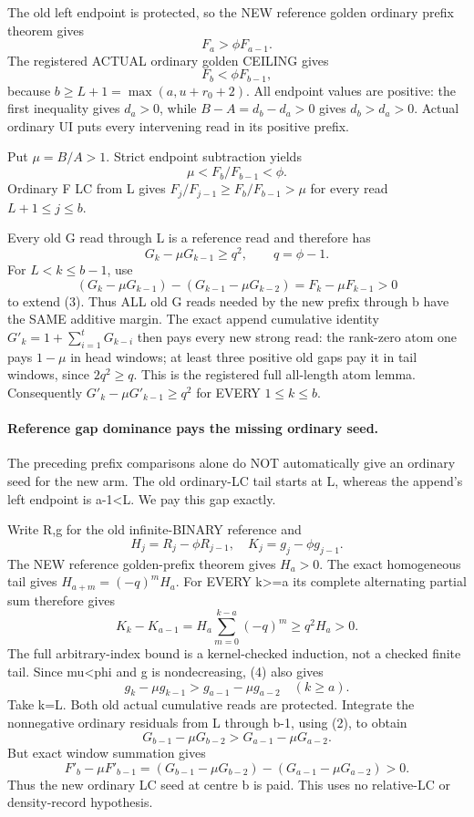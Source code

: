 The old left endpoint is protected, so the NEW reference golden
ordinary prefix theorem gives
\[
                    F_a>\phi F_{a-1}.
\]
The registered ACTUAL ordinary golden CEILING gives
\[
                    F_b<\phi F_{b-1},
\]
because $b\ge L+1=\max(a,u+r_0+2)$.
All endpoint values are positive: the first inequality gives $d_a>0$,
while $B-A=d_b-d_a>0$ gives $d_b>d_a>0$.
Actual ordinary UI puts every intervening read in its positive prefix.

Put $\mu=B/A>1$. Strict endpoint subtraction yields
\[
                  \mu<F_b/F_{b-1}<\phi.             \tag{2}
\]
Ordinary F LC from L gives $F_j/F_{j-1}\ge F_b/F_{b-1}>\mu$
for every read $L+1\le j\le b$.

Every old G read through L is a reference read and therefore has
\[
                         G_k-\mu G_{k-1}\ge q^2,
                   \qquad q=\phi-1.                 \tag{3}
\]
For $L<k\le b-1$, use
\[
 (G_k-\mu G_{k-1})-(G_{k-1}-\mu G_{k-2})
                              =F_k-\mu F_{k-1}>0
\]
to extend (3). Thus ALL old G reads needed by the new prefix
through b have the SAME additive margin.
The exact append cumulative identity
$G'_k=1+\sum_{i=1}^tG_{k-i}$ then pays every new strong read:
the rank-zero atom one pays $1-\mu$ in head windows; at least three
positive old gaps pay it in tail windows, since $2q^2\ge q$.
This is the registered full all-length atom lemma.
Consequently $G'_k-\mu G'_{k-1}\ge q^2$ for EVERY $1\le k\le b$.

\paragraph{Reference gap dominance pays the missing ordinary seed.}
The preceding prefix comparisons alone do NOT automatically give an
ordinary seed for the new arm. The old ordinary-LC tail starts at L,
whereas the append's left endpoint is a-1<L.
We pay this gap exactly.

Write R,g for the old infinite-BINARY reference and
\[
 H_j=R_j-\phi R_{j-1},\quad K_j=g_j-\phi g_{j-1}.
\]
The NEW reference golden-prefix theorem gives $H_a>0$.
The exact homogeneous tail gives $H_{a+m}=(-q)^mH_a$.
For EVERY k>=a its complete alternating partial sum therefore gives
\[
 K_k-K_{a-1}
   =H_a\sum_{m=0}^{k-a}(-q)^m\ge q^2H_a>0.          \tag{4}
\]
The full arbitrary-index bound is a kernel-checked induction, not
a checked finite tail. Since mu<phi and g is nondecreasing, (4) also gives
\[
 g_k-\mu g_{k-1}>g_{a-1}-\mu g_{a-2}\quad(k\ge a).
\]
Take k=L. Both old actual cumulative reads are protected.
Integrate the nonnegative ordinary residuals from L through b-1,
using (2), to obtain
\[
 G_{b-1}-\mu G_{b-2}>G_{a-1}-\mu G_{a-2}.
\]
But exact window summation gives
\[
 F'_b-\mu F'_{b-1}
 =(G_{b-1}-\mu G_{b-2})-(G_{a-1}-\mu G_{a-2})>0.    \tag{5}
\]
Thus the new ordinary LC seed at centre b is paid.
This uses no relative-LC or density-record hypothesis.

